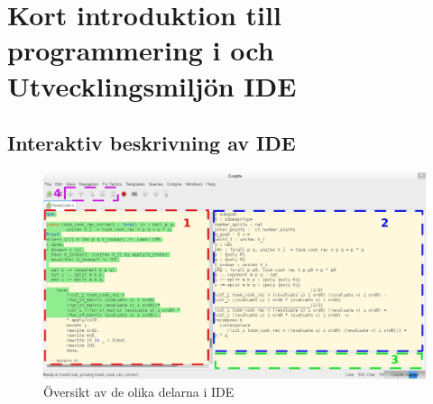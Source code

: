 \section{Kort introduktion till programmering i \coq och Utvecklingsmiljön \coq
IDE}

\subsection{Interaktiv beskrivning av \coq IDE}

\begin{figure}[H]
  \centering
  \includegraphics[width=\textwidth]{images/Overview}
  \caption[Översikt av \coq IDE]
   {Översikt av de olika delarna i \coq IDE}
\end{figure}

